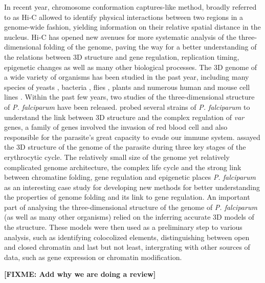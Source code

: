 \documentclass[letterpaper,12pt]{article}
\newcommand{\fixme}[1]{\textbf{[FIXME: #1]}}
\begin{document}
In recent year, chromosome conformation captures-like method, broadly referred
to as Hi-C allowed to identify physical interactions between two regions in a
genome-wide fashion, yielding information on their relative spatial distance
in the nucleus. Hi-C has opened new avenues for more systematic analysis of
the three-dimensional folding of the genome, paving the way for a better
understanding of the relations between 3D structure and gene regulation,
replication timing, epigenetic changes as well as many other biological
processes. The 3D genome of a wide variety of organisms has been studied in
the past year, including many species of yeasts \citep{duan:three-dimensional,
burton:species-level, mizuguchi:cohesin-dependent}, bacteria
\citep{umbarger:three-dimensional}, flies \citep{sexton:three-dimensional},
plants \citep{feng:genome-wide, wang:genome-wide} and numerous human and mouse
cell lines \citep{lieberman-aiden:comprehensive, rao:3D}. Within the past few
years, two studies of the three-dimensional structure of {\em P. falciparum}
have been released.  \citet{lemieux:genome-wide} probed several strains of
{\em P. falciparum} to understand the link between 3D structure and the
complex regulation of \textit{var} genes, a family of genes involved the
invasion of red blood cell and also responsible for the parasite's great
capacity to evade our immune system. \citet{ay:three-dimensional} assayed the
3D structure of the genome of the parasite during three key stages of the
erythrocytic cycle. The relatively small size of the genome yet relatively
complicated genome architecture, the complex life cycle and the strong link
between chromatine folding, gene regulation and epigenetic places {\em P.
falciparum} as an interesting case study for developing new methods for better
understanding the properties of genome folding and its link to gene
regulation. An important part of analysing the three-dimensional structure of
the genome of {\em P. falciparum} (as well as many other organisms) relied on
the inferring accurate 3D models of the structure. These models were then used
as a preliminary step to various analysis, such as identifying colocolized
elements, distinguishing between open and closed chromatin and last but not
least, intergrating with other sources of data, such as gene expression or
chromatin modification. 

\fixme{Add why we are doing a review}
\end{document}

